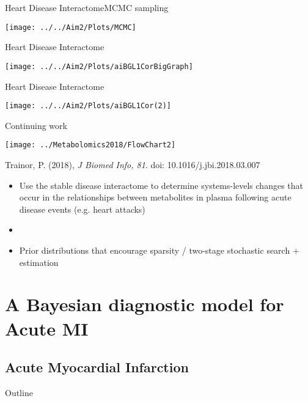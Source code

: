 \documentclass[xcolor=dvipsnames]{beamer}
\begin{document}
\begin{frame}{Heart Disease Interactome}{MCMC sampling}
	\vspace{-10.5pt}
	\begin{center}
		\texttt{[image: ../../Aim2/Plots/MCMC]}
	\end{center}
\end{frame}

\begin{frame}{Heart Disease Interactome}
	\vspace{-10.5pt}
	\begin{center}
		\texttt{[image: ../../Aim2/Plots/aiBGL1CorBigGraph]}
	\end{center}
\end{frame}

\begin{frame}{Heart Disease Interactome}
	\vspace{-10.5pt}
	\begin{center}
		\texttt{[image: ../../Aim2/Plots/aiBGL1Cor(2)]}
	\end{center}
\end{frame}

\begin{frame}{Continuing work}
	\vspace{-15pt}
	\begin{center}
		\texttt{[image: ../Metabolomics2018/FlowChart2]}
		
		Trainor, P. (2018), \emph{J Biomed Info, 81}. doi: 10.1016/j.jbi.2018.03.007 \pause
	\end{center}
	\begin{itemize}
		\item Use the stable disease interactome to determine systems-levels changes that occur in the relationships between metabolites in plasma following acute disease events (e.g. heart attacks) \pause
		\item[]
		\item Prior distributions that encourage sparsity / two-stage stochastic search + estimation 
	\end{itemize}
\end{frame}

\section{A Bayesian diagnostic model for Acute MI}
\subsection{Acute Myocardial Infarction}
\begin{frame}{Outline}
\vspace{-10.5pt}
\tableofcontents[currentsection,subsectionstyle=hide]
\end{frame}
\end{document}
